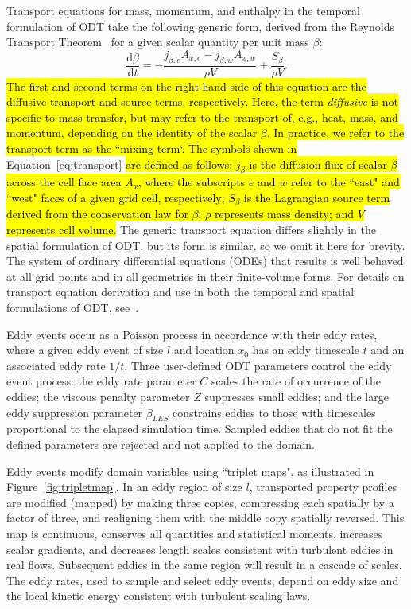 \documentclass[preprint,12pt, a4paper]{elsarticle}
\begin{document}
Transport equations for mass, momentum, and enthalpy in the temporal formulation of ODT take the following generic form, derived from the Reynolds Transport Theorem~\cite{Cengel_2010} for a given scalar quantity per unit mass $\beta$: 
\begin{equation} 
\label{eq:transport}
	\frac{\mathrm{d}\beta}{\mathrm{d}t} = -\frac{j_{\beta,e}A_{x,e}-j_{\beta,w}A_{x,w}}{\rho V} + \frac{S_{\beta}}{\rho V}.
\end{equation}
\hl{The first and second terms on the right-hand-side of this equation are the diffusive transport and source terms, respectively. Here, the term \emph{diffusive} is not specific to mass transfer, but may refer to the transport of, e.g., heat, mass, and momentum, depending on the identity of the scalar $\beta$. In practice, we refer to the transport term as the ``mixing term`. The symbols shown in} Equation~\ref{eq:transport} \hl{are defined as follows: $j_{\beta}$ is the diffusion flux of scalar $\beta$ across the cell face area $A_x$, where the subscripts $e$ and $w$ refer to the ``east" and ``west" faces of a given grid cell, respectively; $S_{\beta}$ is the Lagrangian source term derived from the conservation law for $\beta$; $\rho$ represents mass density; and $V$ represents cell volume.} The generic transport equation differs slightly in the spatial formulation of ODT, but its form is similar, so we omit it here for brevity. The system of ordinary differential equations (ODEs) that results is well behaved at all grid points and in all geometries in their finite-volume forms. For details on transport equation derivation and use in both the temporal and spatial formulations of ODT, see~\cite{Lignell_2018}. 

Eddy events occur as a Poisson process in accordance with their eddy rates, where a given eddy event of size $l$ and location $x_0$ has an eddy timescale $t$ and an associated eddy rate $1/t$. Three user-defined ODT parameters control the eddy event process: the eddy rate parameter $C$ scales the rate of occurrence of the eddies; the viscous penalty parameter $Z$ suppresses small eddies; and the large eddy suppression parameter $\beta_{LES}$ constrains eddies to those with timescales proportional to the elapsed simulation time. Sampled eddies that do not fit the defined parameters are rejected and not applied to the domain.

Eddy events modify domain variables using ``triplet maps", as illustrated in Figure~\ref{fig:tripletmap}. In an eddy region of size $l$, transported property profiles are modified (mapped) by making three copies, compressing each spatially by a factor of three, and realigning them with the middle copy spatially reversed. This map is continuous, conserves all quantities and statistical moments, increases scalar gradients, and decreases length scales consistent with turbulent eddies in real flows. Subsequent eddies in the same region will result in a cascade of scales. The eddy rates, used to sample and select eddy events, depend on eddy size and the local kinetic energy consistent with turbulent scaling laws.  
\end{document}
